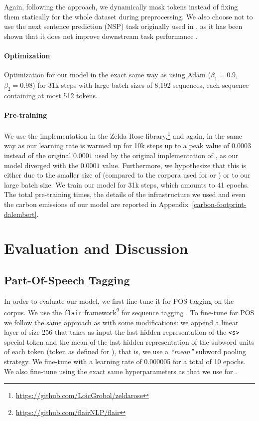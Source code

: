 Again, following the \roberta approach, we dynamically mask tokens instead of fixing them statically for the whole dataset during preprocessing. We also choose not to use the next sentence prediction (NSP) task originally used in \bert \citep{devlin-etal-2019-bert}, as it has been shown that it does not improve downstream task performance \citep{conneau-lample-2019-cross,liu-etal-2019-roberta}.

\paragraph{Optimization}
Optimization for our model in the exact same way as \citep{liu-etal-2019-roberta} using Adam \citep{kingma-ba-2015-adam} ($\beta_1 = 0.9$, $\beta_2 = 0.98$) for 31k steps with large batch sizes of 8,192 sequences, each sequence containing at most 512 tokens.

\paragraph{Pre-training}
We use the \roberta implementation in the Zelda Rose library,\footnote{\url{https://github.com/LoicGrobol/zeldarose}} and again, in the same way as \citet{liu-etal-2019-roberta} our learning rate is warmed up for 10k steps up to a peak value of $0.0003$ instead of the original $0.0001$ used by the original implementation of \roberta \citep{liu-etal-2019-roberta}, as our model diverged with the $0.0001$ value. Furthermore, we hypothesize that this is either due to the smaller size of \freemmax (compared to the corpora used for \roberta or \camembert) or to our large batch size. We train our model for 31k steps, which amounts to 41 epochs. The total pre-training times, the details of the infrastructure we used and even the carbon emissions of our model are reported in Appendix~\ref{carbon-footprint-dalembert}.

\section{Evaluation and Discussion}

\subsection{Part-Of-Speech Tagging}

In order to evaluate our \dalembert model, we first fine-tune it for POS tagging on the \freemlpm corpus. We use the \texttt{flair} framework\footnote{\url{https://github.com/flairNLP/flair}} for sequence tagging \citep{akbik-etal-2019-flair}. To fine-tune \dalembert for POS we follow the same approach as \citet{schweter-akbik-2020-flert} with some modifications: we append a linear layer of size 256 that takes as input the last hidden representation of the \texttt{<s>} special token and the mean of the last hidden representation of the subword units of each token (token as defined for \freemlpm), that is, we use a \emph{``mean''} subword pooling strategy. We fine-tune \dalembert with a learning rate of 0.000005 for a total of 10 epochs. We also fine-tune \camembert using the exact same hyperparameters as that we use for \dalembert.

